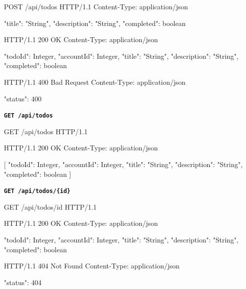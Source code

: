 \begin{httpexchange}
\begin{httplisting}
POST /api/todos HTTP/1.1
Content-Type: application/json

{
    "title": "String",
    "description": "String",
    "completed": boolean
}
\end{httplisting}
\httpmidarrows
\begin{httplisting}
HTTP/1.1 200 OK
Content-Type: application/json

{
    "todoId": Integer,
    "accountId": Integer,
    "title": "String",
    "description": "String",
    "completed": boolean
}

HTTP/1.1 400 Bad Request
Content-Type: application/json

{
    "status": 400
}
\end{httplisting}
\end{httpexchange}

\textbf{\texttt{GET /api/todos}}

\begin{httpexchange}
\begin{httplisting}
GET /api/todos HTTP/1.1
\end{httplisting}
\httpmidarrows
\begin{httplisting}
HTTP/1.1 200 OK
Content-Type: application/json

[
    {
        "todoId": Integer,
        "accountId": Integer,
        "title": "String",
        "description": "String",
        "completed": boolean
    }
]
\end{httplisting}
\end{httpexchange}




\newpage



\textbf{\texttt{GET /api/todos/\{id\}}}

\begin{httpexchange}
\begin{httplisting}
GET /api/todos/{id} HTTP/1.1
\end{httplisting}
\httpmidarrows
\begin{httplisting}
HTTP/1.1 200 OK
Content-Type: application/json

{
    "todoId": Integer,
    "accountId": Integer,
    "title": "String",
    "description": "String",
    "completed": boolean
}

HTTP/1.1 404 Not Found
Content-Type: application/json

{
    "status": 404
}
\end{httplisting}
\end{httpexchange}

